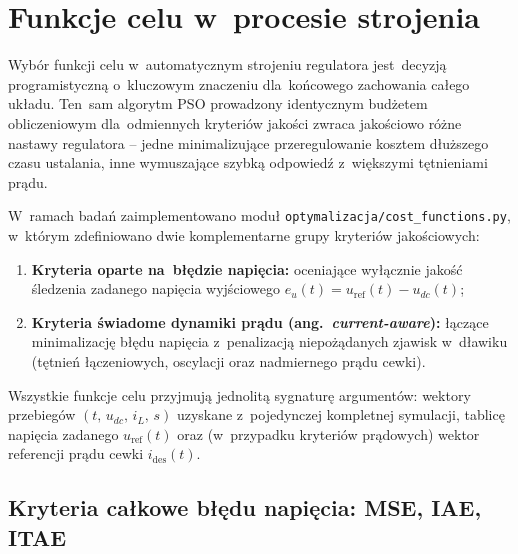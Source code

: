 \section{Funkcje celu w~procesie strojenia}
\label{sec:fitness}

Wybór funkcji celu w~automatycznym strojeniu regulatora jest~decyzją programistyczną o~kluczowym znaczeniu dla~końcowego zachowania całego układu. Ten~sam algorytm PSO prowadzony identycznym budżetem obliczeniowym dla~odmiennych kryteriów jakości zwraca jakościowo różne nastawy regulatora -- jedne minimalizujące przeregulowanie kosztem dłuższego czasu ustalania, inne wymuszające szybką odpowiedź z~większymi tętnieniami prądu.

W~ramach badań zaimplementowano moduł \texttt{optymalizacja/cost\_functions.py}, w~którym zdefiniowano dwie komplementarne grupy kryteriów jakościowych:
\begin{enumerate}
    \item \textbf{Kryteria oparte na~błędzie napięcia:} oceniające wyłącznie jakość śledzenia zadanego napięcia wyjściowego $e_u(t) = u_{\mathrm{ref}}(t) - u_{dc}(t)$;
    \item \textbf{Kryteria świadome dynamiki prądu (ang.~\emph{current-aware}):} łączące minimalizację błędu napięcia z~penalizacją niepożądanych zjawisk w~dławiku (tętnień łączeniowych, oscylacji oraz nadmiernego prądu cewki).
\end{enumerate}

Wszystkie funkcje celu przyjmują jednolitą sygnaturę argumentów: wektory przebiegów $(t,\,u_{dc},\,i_L,\,s)$ uzyskane z~pojedynczej kompletnej symulacji, tablicę napięcia zadanego $u_{\mathrm{ref}}(t)$ oraz (w~przypadku kryteriów prądowych) wektor referencji prądu cewki $i_{\mathrm{des}}(t)$.

\subsection{Kryteria całkowe błędu napięcia: MSE, IAE, ITAE}
\label{subsec:cost-integral}

